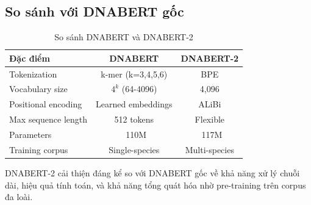 \subsection{So sánh với DNABERT gốc}

\begin{table}[h]
\centering
\caption{So sánh DNABERT và DNABERT-2}
\label{tab:dnabert_comparison}
\begin{tabular}{lcc}
\toprule
\textbf{Đặc điểm} & \textbf{DNABERT} & \textbf{DNABERT-2} \\
\midrule
Tokenization & k-mer (k=3,4,5,6) & BPE \\
Vocabulary size & $4^k$ (64-4096) & 4,096 \\
Positional encoding & Learned embeddings & ALiBi \\
Max sequence length & 512 tokens & Flexible \\
Parameters & ~110M & ~117M \\
Training corpus & Single-species & Multi-species \\
\bottomrule
\end{tabular}
\end{table}

DNABERT-2 cải thiện đáng kể so với DNABERT gốc về khả năng xử lý chuỗi dài, hiệu quả tính toán, và khả năng tổng quát hóa nhờ pre-training trên corpus đa loài.

